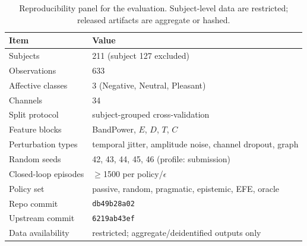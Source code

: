 \begin{table}[t]\centering
\caption{Reproducibility panel for the evaluation. Subject-level data are restricted; released artifacts are aggregate or hashed.}
\label{tab:reproducibility}
\begin{tabular}{ll}
\toprule
Item & Value \\
\midrule
Subjects & 211 (subject 127 excluded) \\
Observations & 633 \\
Affective classes & 3 (Negative, Neutral, Pleasant) \\
Channels & 34 \\
Split protocol & subject-grouped cross-validation \\
Feature blocks & BandPower, $E$, $D$, $T$, $C$ \\
Perturbation types & temporal jitter, amplitude noise, channel dropout, graph \\
Random seeds & 42, 43, 44, 45, 46 (profile: submission) \\
Closed-loop episodes & $\geq$1500 per policy/$\epsilon$ \\
Policy set & passive, random, pragmatic, epistemic, EFE, oracle \\
Repo commit & \texttt{db49b28a02} \\
Upstream commit & \texttt{6219ab43ef} \\
Data availability & restricted; aggregate/deidentified outputs only \\
\bottomrule
\end{tabular}
\end{table}
